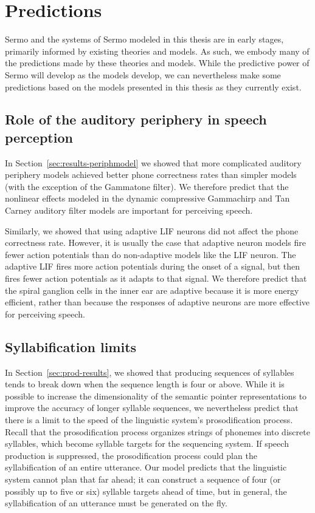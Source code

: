 \section{Predictions}

Sermo and the systems of Sermo modeled in this thesis
are in early stages,
primarily informed by existing
theories and models.
As such, we embody many of the predictions made
by these theories and models.
While the predictive power of Sermo
will develop as the models develop,
we can nevertheless make some predictions
based on the models presented in this thesis
as they currently exist.

\subsection{Role of the auditory periphery in speech perception}

In Section~\ref{sec:results-periphmodel} we showed
that more complicated auditory periphery models
achieved better phone correctness rates
than simpler models
(with the exception of the Gammatone filter).
We therefore predict that
the nonlinear effects modeled
in the dynamic compressive Gammachirp
and Tan Carney auditory filter models
are important for perceiving speech.

Similarly, we showed that using adaptive LIF neurons
did not affect the phone correctness rate.
However, it is usually the case that
adaptive neuron models fire fewer action potentials
than do non-adaptive models like the LIF neuron.
The adaptive LIF fires more action potentials
during the onset of a signal,
but then fires fewer action potentials
as it adapts to that signal.
We therefore predict that
the spiral ganglion cells in the inner ear
are adaptive because it is more energy efficient,
rather than because the responses
of adaptive neurons are more effective
for perceiving speech.

\subsection{Syllabification limits}

In Section~\ref{sec:prod-results},
we showed that producing
sequences of syllables
tends to break down
when the sequence length is four or above.
While it is possible to increase the
dimensionality of the
semantic pointer representations
to improve the accuracy
of longer syllable sequences,
we nevertheless predict that
there is a limit to the speed
of the linguistic system's
prosodification process.
Recall that the prosodification process
organizes strings of phonemes
into discrete syllables,
which become syllable targets for
the sequencing system.
If speech production is suppressed,
the prosodification process
could plan the syllabification
of an entire utterance.
Our model predicts that
the linguistic system
cannot plan that far ahead;
it can construct a sequence of four
(or possibly up to five or six)
syllable targets ahead of time,
but in general,
the syllabification of an utterance
must be generated on the fly.

